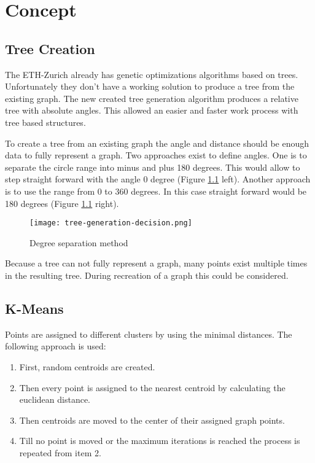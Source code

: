 \chapter{Concept}
\section{Tree Creation}
\label{sec:tree_creation_angle}
The ETH-Zurich already has genetic optimizations algorithms based on trees. Unfortunately they don't have a working solution to produce a tree from the existing graph. The new created tree generation algorithm produces a relative tree with absolute angles. This allowed an easier and faster work process with tree based structures.

To create a tree from an existing graph the angle and distance should be enough data to fully represent a graph.
Two approaches exist to define angles. One is to separate the circle range into minus and plus 180 degrees. This would allow to step straight forward with the angle 0 degree (Figure \ref{fig:tree-generation-decision} left). Another approach is to use the range from 0 to 360 degrees. In this case straight forward would be 180 degrees (Figure \ref{fig:tree-generation-decision} right).

\begin{figure}[!ht]
    \centering
    \texttt{[image: tree-generation-decision.png]}
    \caption{Degree separation method \label{fig:tree-generation-decision}}
\end{figure}

Because a tree can not fully represent a graph, many points exist multiple times in the resulting tree. During recreation of a graph this could be considered.

\FloatBarrier
\pagebreak
\section{K-Means}
Points are assigned to different clusters by using the minimal distances. The following approach is used:

\begin{enumerate}
    \item First, random centroids are created.
    \item Then every point is assigned to the nearest centroid by calculating the euclidean distance.
    \item Then centroids are moved to the center of their assigned graph points.
    \item Till no point is moved or the maximum iterations is reached the process is repeated from item 2.
\end{enumerate}

